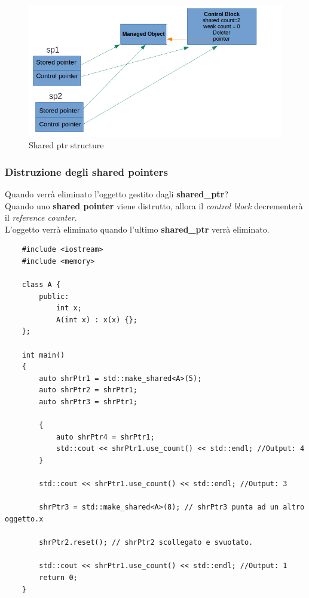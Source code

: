 \begin{figure}[H]
	\centering
	\includegraphics[width=1.2\textwidth, height=1.2\textheight, keepaspectratio]{./imgs/shared_ptr_structure.png}
	\caption{Shared ptr structure}
	\label{fig:shared_ptr_structure}
\end{figure}

\subsubsection{Distruzione degli shared pointers}

\textsf{\small Quando verrà eliminato l'oggetto gestito dagli \textbf{shared\_ptr}?} \\

\textsf{\small Quando uno \textbf{shared pointer} viene distrutto, allora il \emph{control block} decrementerà il \emph{reference counter}.} \\

\textsf{\small L'oggetto verrà eliminato quando l'ultimo \textbf{shared\_ptr} verrà eliminato.} \\

\begin{lstlisting}
	#include <iostream>
	#include <memory>
	
	class A {
		public:
			int x;
			A(int x) : x(x) {};
	};

	int main()
	{
		auto shrPtr1 = std::make_shared<A>(5);
		auto shrPtr2 = shrPtr1;
		auto shrPtr3 = shrPtr1;
		
		{
			auto shrPtr4 = shrPtr1;
			std::cout << shrPtr1.use_count() << std::endl; //Output: 4
		}
		
		std::cout << shrPtr1.use_count() << std::endl; //Output: 3
		
		shrPtr3 = std::make_shared<A>(8); // shrPtr3 punta ad un altro oggetto.x
		
		shrPtr2.reset(); // shrPtr2 scollegato e svuotato.
		
		std::cout << shrPtr1.use_count() << std::endl; //Output: 1
		return 0;
	}
\end{lstlisting}

